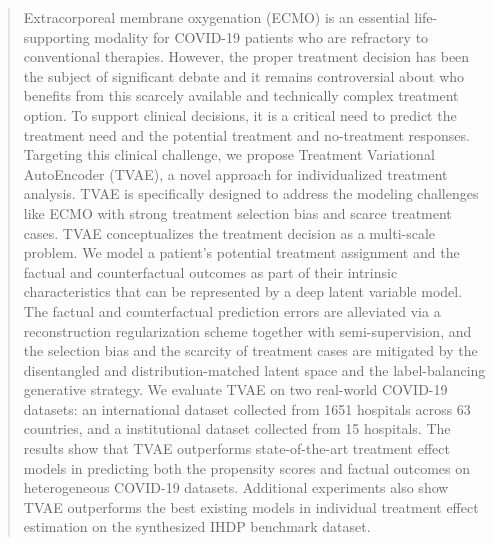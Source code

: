 \begin{abstract}
Extracorporeal membrane oxygenation (ECMO) is an essential life-supporting modality for COVID-19 patients who are refractory to conventional therapies. However, the proper treatment decision  has been the subject of significant debate and it remains controversial about who benefits from this scarcely available and technically complex treatment option. To support clinical decisions, it is a critical need to predict the treatment need and the potential treatment and no-treatment responses. Targeting this clinical challenge, we propose Treatment Variational AutoEncoder (TVAE), a novel approach for individualized treatment analysis. TVAE is specifically designed to address the modeling challenges like ECMO with strong treatment selection bias and scarce treatment cases. TVAE conceptualizes the treatment decision as a multi-scale problem. We model a patient's potential treatment assignment and the factual and counterfactual outcomes as part of their intrinsic characteristics that can be represented by a deep latent variable model. The factual and counterfactual prediction errors are alleviated via a reconstruction regularization scheme together with semi-supervision, and the selection bias and the scarcity of treatment cases are mitigated by the disentangled and distribution-matched latent space and the label-balancing generative strategy. We evaluate TVAE on two real-world COVID-19 datasets: an international dataset collected from 1651 hospitals across 63 countries, and a institutional dataset collected from 15 hospitals. The results show that TVAE outperforms state-of-the-art treatment effect models in predicting both the propensity scores and factual outcomes on heterogeneous COVID-19 datasets. Additional experiments also show TVAE outperforms the best existing models in individual treatment effect estimation on the synthesized IHDP benchmark dataset.
\end{abstract}

